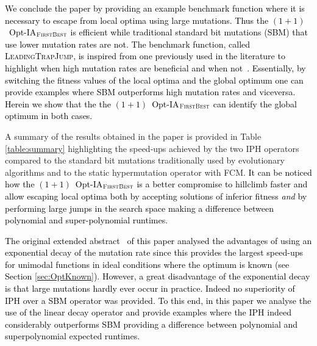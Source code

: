 \documentclass[lettersize,journal]{IEEEtran}
\newcommand{\new}[1]{\textcolor{black}{#1}}
\begin{document}
\new{We conclude the paper by providing an example benchmark function where it is necessary to escape from local optima using large mutations. Thus the $(1+1)$~Opt-IA$_{\textsc{FirstBest}}$ is efficient while traditional standard bit mutations (SBM) that use lower mutation rates are not. The benchmark function, called \textsc{LeadingTrapJump}, is inspired from one previously used in the literature to highlight when high mutation rates are beneficial and when not~\cite{OlivetoLehreNeumann09}. Essentially, by switching the fitness values of the local optima and the global optimum one can provide examples where SBM outperforms high mutation rates and viceversa. Herein we show that the the $(1+1)$~Opt-IA$_{\textsc{FirstBest}}$ can identify the global optimum in both cases.}



A summary of the results obtained in the paper is provided in Table \ref{table:summary} highlighting the speed-ups achieved by the two IPH operators compared to the standard bit mutations traditionally  used by evolutionary algorithms and to the static hypermutation operator with FCM.
\new{It can be noticed how the $(1+1)$~Opt-IA$_{\textsc{FirstBest}}$ is a better compromise to hillclimb faster and allow escaping local optima both by accepting solutions of inferior fitness {\it and} by performing large jumps in the search space making a difference between polynomial and super-polynomial runtimes.}

\new{The original extended abstract~\cite{CorusOlivetoYazdaniIPH2019} of this paper analysed the advantages of using an exponential decay of the mutation rate since this provides the largest speed-ups for unimodal functions in ideal conditions where the optimum is known (see Section \ref{sec:OptKnown}). However, a great disadvantage of the exponential decay is that large mutations hardly ever occur in practice. Indeed no superiority of IPH over a SBM operator was provided.  To this end, in this paper we analyse the use of the linear decay operator and  provide examples where the IPH indeed considerably outperforms SBM providing a difference between polynomial and superpolynomial expected runtimes.}



 
 
 
\end{document}
